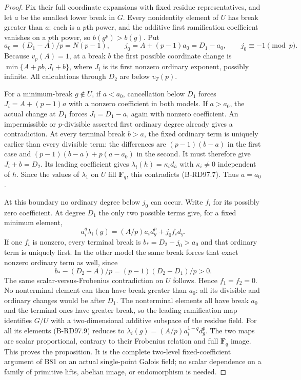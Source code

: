 \begin{proof}
Fix their full coordinate expansions with fixed residue
representatives, and let $a$ be the smallest lower break in $G$.
Every nonidentity element of $U$ has break greater than $a$:
each is a $p$th power, and the additive first ramification
coefficient vanishes on a $p$th power, so $b(g^p)>b(g)$.
Put
\[
 a_0=(D_1-A)/p=N(p-1),\qquad
 j_0=A+(p-1)a_0=D_1-a_0,\qquad j_0\equiv-1\pmod p.
                                                        \tag{B-RD97.8}
\]
Because $v_p(A)=1$, at a break $b$ the first possible coordinate
change is $\min\{A+pb,J_i+b\}$, where $J_i$ is its first
nonzero ordinary exponent, possibly infinite. All calculations
through $D_2$ are below $v_T(p)$.

For a minimum-break $g\notin U$, if $a<a_0$, cancellation below
$D_1$ forces $J_i=A+(p-1)a$ with a nonzero coefficient in both
models. If $a>a_0$, the actual change at $D_1$ forces
$J_i=D_1-a$, again with nonzero coefficient. An impermissible
or $p$-divisible asserted first ordinary degree already gives a
contradiction. At every terminal break $b>a$, the fixed ordinary
term is uniquely earlier than every divisible term: the differences
are $(p-1)(b-a)$ in the first case and
$(p-1)(b-a)+p(a-a_0)$ in the second. It must therefore give
$J_i+b=D_2$. Its leading coefficient gives
$\lambda_i(h)=\kappa_i d_h$ with $\kappa_i\ne0$ independent
of $h$. Since the values of $\lambda_1$ on $U$ fill $\mathbf F_q$,
this contradicts (B-RD97.7). Thus $a=a_0$.

At this boundary no ordinary degree below $j_0$ can occur.
Write $f_i$ for its possibly zero coefficient. At degree $D_1$
the only two possible terms give, for a fixed minimum element,
\[
 a_i^q\lambda_i(g)=(A/p)a_i d_g^p+j_0 f_i d_g.
                                                        \tag{B-RD97.9}
\]
If one $f_i$ is nonzero, every terminal break is
$b_*=D_2-j_0>a_0$ and that ordinary term is uniquely first.
In the other model the same break forces that exact nonzero
ordinary term as well, since
\[
           b_*-(D_2-A)/p=(p-1)(D_2-D_1)/p>0.
                                                        \tag{B-RD97.10}
\]
The same scalar-versus-Frobenius contradiction on $U$ follows.
Hence $f_1=f_2=0$. No nonterminal element can then have break
greater than $a_0$: all its divisible and ordinary changes would
be after $D_1$. The nonterminal elements all have break $a_0$
and the terminal ones have greater break, so the leading
ramification map identifies $G/U$ with a two-dimensional additive
subspace of the residue field. For all its elements (B-RD97.9)
reduces to $\lambda_i(g)=(A/p)a_i^{1-q}d_g^p$.
The two maps are scalar proportional, contrary to their Frobenius
relation and full $\mathbf F_q$ image. This proves the proposition.
It is the complete two-level fixed-coefficient argument of B81
on an actual single-point Galois field; no scalar dependence on a
family of primitive lifts, abelian image, or endomorphism is needed.
\end{proof}

